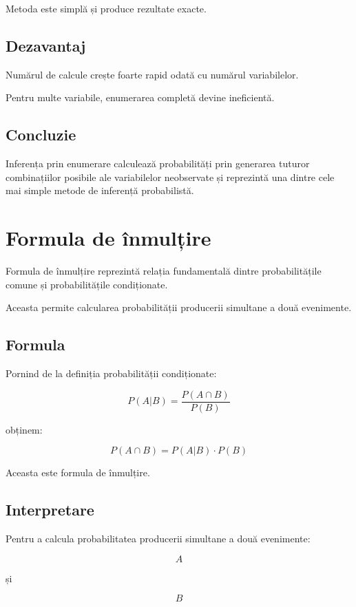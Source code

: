 \documentclass[12pt,a4paper]{article}
\begin{document}
Metoda este simplă și produce rezultate exacte.

\subsection{Dezavantaj}

Numărul de calcule crește foarte rapid odată cu numărul variabilelor.

Pentru multe variabile, enumerarea completă devine ineficientă.

\subsection{Concluzie}

Inferența prin enumerare calculează probabilități prin generarea tuturor combinațiilor posibile ale variabilelor neobservate și reprezintă una dintre cele mai simple metode de inferență probabilistă.




\section{Formula de înmulțire}

Formula de înmulțire reprezintă relația fundamentală dintre probabilitățile comune și probabilitățile condiționate.

Aceasta permite calcularea probabilității producerii simultane a două evenimente.

\subsection{Formula}

Pornind de la definiția probabilității condiționate:

\[
P(A|B)
=
\frac{P(A \cap B)}
     {P(B)}
\]

obținem:

\[
P(A \cap B)
=
P(A|B)\cdot P(B)
\]

Aceasta este formula de înmulțire.

\subsection{Interpretare}

Pentru a calcula probabilitatea producerii simultane a două evenimente:

\[
A
\]

și

\[
B
\]
\end{document}

